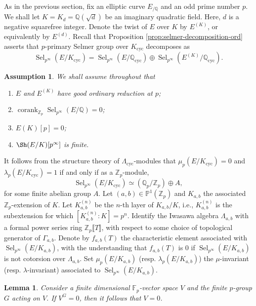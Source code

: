 \documentclass[12pt]{amsart}
\newtheorem{lemma}[theorem]{Lemma}
\newtheorem{ass}[theorem]{Assumption}
\newcommand{\Z}{\mathbb{Z}}
\newcommand{\Q}{\mathbb{Q}}
\newcommand{\F}{\mathbb{F}}
\newcommand{\op}[1]{\operatorname{#1}}
\numberwithin{equation}{section}
\begin{document}
\par As in the previous section, fix an elliptic curve $E_{/\Q}$ and an odd prime number $p$. We shall let $K=K_d=\Q(\sqrt{d})$ be an imaginary quadratic field. Here, $d$ is a negative squarefree integer. Denote the twist of $E$ over $K$ by $E^{(K)}$, or equivalently by $E^{(d)}$. Recall that Proposition \ref{prop:selmer-decomposition-ord} asserts that $p$-primary Selmer group over $K_{\op{cyc}}$ decomposes as
\[\op{Sel}_{p^\infty}(E/K_{\op{cyc}})=\op{Sel}_{p^\infty}(E/\Q_{\op{cyc}})\oplus \op{Sel}_{p^\infty}(E^{(K)}/\Q_{\op{cyc}}).\]

\begin{ass}
    We shall assume throughout that 
    \begin{enumerate}
        \item $E$ and $E^{(K)}$ have good ordinary reduction at $p$;
        \item  $\op{corank}_{\Z_p} \op{Sel}_{p^\infty}(E/\Q)=0$;        \item $E(K)[p]=0$;
        \item $\Sh(E/K)[p^\infty]$ is finite.
    \end{enumerate}

\end{ass}
It follows from the structure theory of $\Lambda_{\op{cyc}}$-modules that $\mu_p(E/K_{\op{cyc}})=0$ and $\lambda_p(E/K_{\op{cyc}})=1$ if and only if as a $\Z_p$-module,
\[\op{Sel}_{p^\infty}(E/K_{\op{cyc}})\simeq \left(\Q_p/\Z_p\right)\oplus A,\] for some finite abelian group $A$. Let $(a,b)\in \mathbb{P}^1(\Z_p)$ and $K_{a,b}$ the associated $\Z_p$-extension of $K$. Let $K_{a,b}^{(n)}$ be the $n$-th layer of $K_{a,b}/K$, i.e., $K_{a,b}^{(n)}$ is the subextension for which $[K_{a,b}^{(n)}:K]=p^n$. Identify the Iwasawa algebra $\Lambda_{a,b}$ with a formal power series ring $\Z_p\llbracket T\rrbracket$, with respect to some choice of topological generator of $\Gamma_{a,b}$. Denote by $f_{a,b}(T)$ the characteristic element associated with $\op{Sel}_{p^\infty}(E/K_{a,b})$, with the understanding that $f_{a,b}(T)$ is $0$ if $\op{Sel}_{p^\infty}(E/K_{a,b})$ is not cotorsion over $\Lambda_{a,b}$. Set $\mu_p(E/K_{a,b})$ (resp. $\lambda_p(E/K_{a,b})$) the $\mu$-invariant (resp. $\lambda$-invariant) associated to $\op{Sel}_{p^\infty}(E/K_{a,b})$. 

\begin{lemma}\label{lemma V^G=0 implies V=0}    Consider a finite dimensional $\F_p$-vector space $V$ and the finite $p$-group $G$ acting on $V$. If $V^G=0$, then it follows that $V=0$.\end{lemma}
\end{document}
